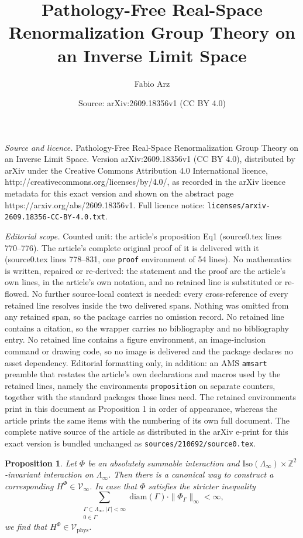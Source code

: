 \documentclass[10pt,a4paper]{amsart}
\title{Pathology-Free Real-Space Renormalization Group Theory on an Inverse Limit Space}
\author{Fabio Arz}
\date{Source: arXiv:2609.18356v1 (CC BY 4.0)}
\newtheorem{proposition}{Proposition}
\newcommand{\Iso}{\mathrm{Iso}}
\newcommand{\diam}{\mathrm{diam}}
\newcommand{\phys}{\mathrm{phys}}
\begin{document}
\maketitle

\noindent\emph{Source and licence.} Pathology-Free Real-Space Renormalization Group Theory on an Inverse Limit Space. Version arXiv:2609.18356v1 (CC BY 4.0), distributed by arXiv under the Creative Commons Attribution 4.0 International licence, http://creativecommons.org/licenses/by/4.0/, as recorded in the arXiv licence metadata for this exact version and shown on the abstract page https://arxiv.org/abs/2609.18356v1. Full licence notice: \texttt{licenses/arxiv-2609.18356-CC-BY-4.0.txt}.\par\smallskip

\noindent\textit{Editorial scope.} Counted unit: the article's proposition Eq1 (source0.tex lines 770--776). The article's complete original proof of it is delivered with it (source0.tex lines 778--831, one \texttt{proof} environment of 54 lines). No mathematics is written, repaired or re-derived: the statement and the proof are the article's own lines, in the article's own notation, and no retained line is substituted or re-flowed.  No further source-local context is needed: every cross-reference of every retained line resolves inside the two delivered spans.  Nothing was omitted from any retained span, so the package carries no omission record.  No retained line contains a citation, so the wrapper carries no bibliography and no bibliography entry.  No retained line contains a figure environment, an image-inclusion command or drawing code, so no image is delivered and the package declares no asset dependency.  Editorial formatting only, in addition: an AMS \texttt{amsart} preamble that restates the article's own declarations and macros used by the retained lines, namely the environments \texttt{proposition} on separate counters, together with the standard packages those lines need.  The retained environments print in this document as Proposition 1 in order of appearance, whereas the article prints the same items with the numbering of its own full document.  The complete native source of the article as distributed in the arXiv e-print for this exact version is bundled unchanged as \texttt{sources/210692/source0.tex}.
\begin{proposition}
    Let $\Phi$ be an absolutely summable interaction and $\Iso(\Lambda_\infty)\times\mathds{Z}^2$-invariant interaction on $\Lambda_\infty$. Then there is a canonical way to construct a corresponding $H^\Phi\in \mathcal{V}_\infty$. In case that $\Phi$ satisfies the stricter inequality
    \begin{equation}\label{Eq1}
        \sum_{\substack{\Gamma\subset\Lambda_\infty,|\Gamma|<\infty\\0\in\Gamma}}\diam(\Gamma)\cdot\|\Phi_\Gamma\|_\infty<\infty,
    \end{equation}
    we find that $H^\Phi\in \mathcal{V}_\phys$.
\end{proposition}
\end{document}
